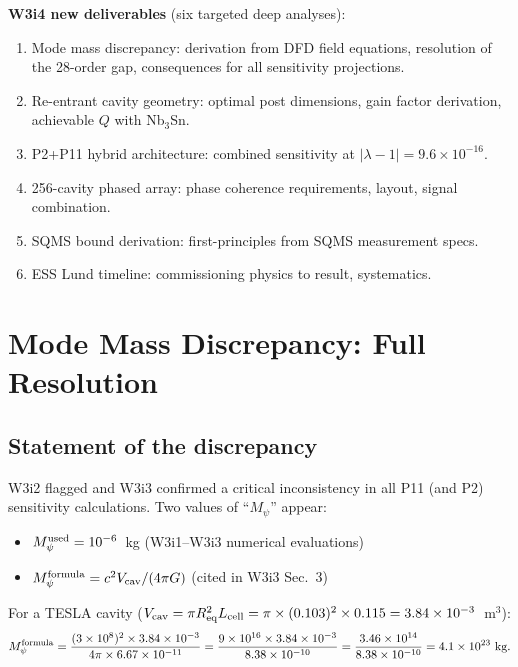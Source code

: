 \documentclass[11pt,twocolumn]{article}
\newcommand{\lam}{\lambda}
\newcommand{\Mpsi}{M_\psi}
\newcommand{\ee}[1]{\times 10^{#1}}
\newcommand{\Vcav}{V_{\rm cav}}
\begin{document}
\textbf{W3i4 new deliverables} (six targeted deep analyses):
\begin{enumerate}[nosep]
\item Mode mass discrepancy: derivation from DFD field equations, resolution
      of the 28-order gap, consequences for all sensitivity projections.
\item Re-entrant cavity geometry: optimal post dimensions, gain factor
      derivation, achievable $Q$ with Nb$_3$Sn.
\item P2+P11 hybrid architecture: combined sensitivity at $|\lam-1| = 9.6\ee{-16}$.
\item 256-cavity phased array: phase coherence requirements, layout, signal
      combination.
\item SQMS bound derivation: first-principles from SQMS measurement specs.
\item ESS Lund timeline: commissioning physics to result, systematics.
\end{enumerate}

\section{Mode Mass Discrepancy: Full Resolution}
\label{sec:mode_mass}

\subsection{Statement of the discrepancy}
\label{sec:discrepancy_statement}

W3i2 flagged and W3i3 confirmed a critical inconsistency in all P11 (and P2)
sensitivity calculations.  Two values of ``$\Mpsi$'' appear:

\begin{itemize}
\item $\Mpsi^{\rm used} = 10^{-6}$~kg (W3i1--W3i3 numerical evaluations)
\item $\Mpsi^{\rm formula} = c^2\Vcav/(4\pi G)$ (cited in W3i3 Sec.~3)
\end{itemize}

For a TESLA cavity ($\Vcav = \pi R_{\rm eq}^2 L_{\rm cell} =
\pi\times(0.103)^2\times0.115 = 3.84\ee{-3}$~m$^3$):
\begin{equation}
\Mpsi^{\rm formula} = \frac{(3\ee{8})^2 \times 3.84\ee{-3}}{4\pi\times6.67\ee{-11}}
= \frac{9\ee{16}\times3.84\ee{-3}}{8.38\ee{-10}}
= \frac{3.46\ee{14}}{8.38\ee{-10}} = 4.1\ee{23}~\text{kg}.
\label{eq:Mpsi_grav_numerical}
\end{equation}
\end{document}
